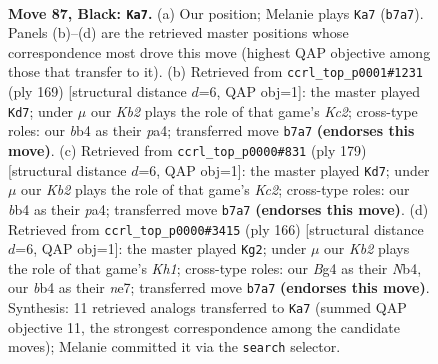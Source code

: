 \documentclass[11pt]{article}
\begin{document}
\clearpage

\begin{figure}[p]\centering
\begin{subfigure}{0.46\textwidth}\centering
\resizebox{\linewidth}{!}{%
\newchessgame
\chessboard[
  setfen={8/1k6/8/8/pBp3b1/8/5K2/1N6 b - - 29 87},
  showmover=false,
  pgfstyle=straightmove, color=movearrow, markmove={b7-a7}
]}
\caption{}
\end{subfigure}\hfill
\begin{subfigure}{0.46\textwidth}\centering
\resizebox{\linewidth}{!}{%
\newchessgame
\chessboard[
  setfen={8/2k5/8/p7/P7/3N4/K3p3/8 b - - 15 85},
  showmover=false,
  pgfstyle=straightmove, color=movearrow, markmove={c7-d7}
]}
\caption{}
\end{subfigure}
\\[4pt]
\begin{subfigure}{0.46\textwidth}\centering
\resizebox{\linewidth}{!}{%
\newchessgame
\chessboard[
  setfen={8/2k5/8/p2K4/P7/3N4/4p3/8 b - - 47 90},
  showmover=false,
  pgfstyle=straightmove, color=movearrow, markmove={c7-d7}
]}
\caption{}
\end{subfigure}\hfill
\begin{subfigure}{0.46\textwidth}\centering
\resizebox{\linewidth}{!}{%
\newchessgame
\chessboard[
  setfen={8/4n3/4P3/6P1/1N6/8/4k3/7K w - - 5 84},
  showmover=false,
  pgfstyle=straightmove, color=movearrow, markmove={h1-g2}
]}
\caption{}
\end{subfigure}
\caption{\textbf{Move 87, Black: \texttt{Ka7}.} (a) Our position; Melanie plays \texttt{Ka7} (\texttt{b7a7}). Panels (b)--(d) are the retrieved master positions whose correspondence most drove this move (highest QAP objective among those that transfer to it). (b) Retrieved from \texttt{ccrl\_top\_p0001\#1231} (ply 169) [structural distance $d$=6, QAP obj=1]: the master played \texttt{Kd7}; under $\mu$ our \emph{Kb2} plays the role of that game's \emph{Kc2}; cross-type roles: our \emph{b}b4 as their \emph{p}a4; transferred move \texttt{b7a7} \textbf{(endorses this move)}. (c) Retrieved from \texttt{ccrl\_top\_p0000\#831} (ply 179) [structural distance $d$=6, QAP obj=1]: the master played \texttt{Kd7}; under $\mu$ our \emph{Kb2} plays the role of that game's \emph{Kc2}; cross-type roles: our \emph{b}b4 as their \emph{p}a4; transferred move \texttt{b7a7} \textbf{(endorses this move)}. (d) Retrieved from \texttt{ccrl\_top\_p0000\#3415} (ply 166) [structural distance $d$=6, QAP obj=1]: the master played \texttt{Kg2}; under $\mu$ our \emph{Kb2} plays the role of that game's \emph{Kh1}; cross-type roles: our \emph{B}g4 as their \emph{N}b4, our \emph{b}b4 as their \emph{n}e7; transferred move \texttt{b7a7} \textbf{(endorses this move)}. Synthesis: 11 retrieved analogs transferred to \texttt{Ka7} (summed QAP objective 11, the strongest correspondence among the candidate moves); Melanie committed it via the \texttt{search} selector.}
\label{fig:thought-m173}
\end{figure}
\end{document}
